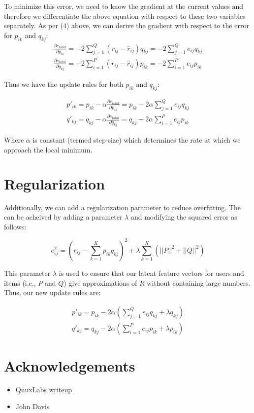 \documentclass[12pt,reqno]{article}
\begin{document}
To minimize this error, we need to know the gradient at the current values and
therefore we differentiate the above equation with respect to these two
variables separately. As per (4) above, we can derive the gradient with respect
to the error for $p_{ik}$ and $q_{kj}$:
\begin{align}
  \frac{\partial e_{total}}{\partial p_{ik}} = -2\sum_{j=1}^{Q}(r_{ij} -
\hat{r}_{ij})q_{kj} = -2\sum_{j=1}^{Q}e_{ij}q_{kj} \\
  \frac{\partial e_{total}}{\partial q_{kj}} = -2\sum_{i=1}^{P}(r_{ij} -
\hat{r}_{ij})p_{ik} = -2\sum_{i=1}^{P}e_{ij}p_{ik}
\end{align}

Thus we have the update rules for both $p_{ik}$ and $q_{kj}$:

\begin{align}
  p'_{ik} = p_{ik} - \alpha\frac{\partial e_{total}}{\partial p_{ik}}
= p_{ik} - 2\alpha\sum_{j=1}^{Q}e_{ij}q_{kj} \\
  q'_{kj} = q_{kj} - \alpha\frac{\partial e_{total}}{\partial q_{kj}}
= q_{kj} - 2\alpha\sum_{i=1}^{P}e_{ij}p_{ik}
\end{align}

Where $\alpha$ is constant (termed step-size) which determines the rate at which
we approach the local minimum.

\section{Regularization}
Additionally, we can add a regularization parameter to reduce overfitting. The
can be acheived by adding a parameter $\lambda$ and modifying the squared error
as follows:

\begin{equation}
  e_{ij}^2 = (r_{ij} - \sum_{k=1}^{K}p_{ik} q_{kj})^2 + 
\lambda\sum_{k=1}^{K}(||P||^2 + ||Q||^2)
\end{equation}

This parameter $\lambda$ is used to ensure that our latent feature vectors for
users and items (i.e., $P$ and $Q$) give approximations of $R$ without
containing large numbers. Thus, our new update rules are:

\begin{align}
  p'_{ik} = p_{ik} - 2\alpha(\sum_{j=1}^{Q}e_{ij}q_{kj} + \lambda q_{kj}) \\
  q'_{kj} = q_{kj} - 2\alpha(\sum_{i=1}^{P}e_{ij}p_{ik} + \lambda p_{ik})
\end{align}

\section{Acknowledgements}
\begin{itemize}
\item QuuxLabs \href{http://www.quuxlabs.com/blog/2010/09/matrix-factorization-a-simple-tutorial-and-implementation-in-python/}{writeup}
\item John Davis
\end{itemize}
\end{document}
